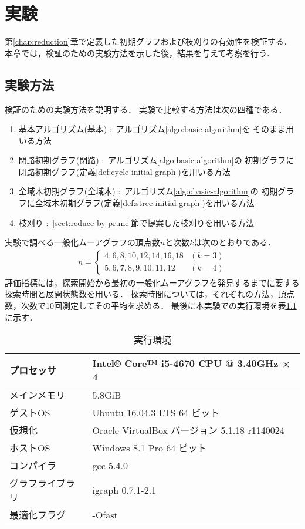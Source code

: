
\chapter{実験}
\label{sect:experiment}
第\ref{chap:reduction}章で定義した初期グラフおよび枝刈りの有効性を検証する．
本章では，検証のための実験方法を示した後，結果を与えて考察を行う．

\section{実験方法}
検証のための実験方法を説明する．
実験で比較する方法は次の四種である．
\begin{enumerate}
\item 基本アルゴリズム(基本) :\ アルゴリズム\ref{algo:basic-algorithm}を
  そのまま用いる方法
\item 閉路初期グラフ(閉路) :\ アルゴリズム\ref{algo:basic-algorithm}の
  初期グラフに閉路初期グラフ(定義\ref{def:cycle-initial-graph})を用いる方法
\item 全域木初期グラフ(全域木) :\ アルゴリズム\ref{algo:basic-algorithm}の
  初期グラフに全域木初期グラフ(定義\ref{def:stree-initial-graph})を用いる方法
\item 枝刈り :\ \ref{sect:reduce-by-prune}節で提案した枝刈りを用いる方法
\end{enumerate}
実験で調べる一般化ムーアグラフの頂点数$n$と次数$k$は次のとおりである．
\begin{equation*}
  \begin{aligned}
    n=\begin{cases}
      4,6,8,10,12,14,16,18 & (k=3) \\
      5,6,7,8,9,10,11,12 & (k=4)
    \end{cases}
  \end{aligned}
\end{equation*}
評価指標には，探索開始から最初の一般化ムーアグラフを発見するまでに要する
探索時間と展開状態数を用いる．
探索時間については，それぞれの方法，頂点数，次数で10回測定してその平均を求める．
最後に本実験での実行環境を表\ref{tab:env-lab}に示す．
\begin{table}
  \caption{実行環境}
  \label{tab:env-lab}
  \centering
  \begin{tabular}{ll}
    \hline
    プロセッサ & Intel® Core™ i5-4670 CPU @ 3.40GHz × 4 \\ \hline
    メインメモリ & 5.8GiB \\ \hline
    ゲストOS & Ubuntu 16.04.3 LTS 64 ビット \\ \hline
    仮想化 & Oracle VirtualBox バージョン 5.1.18 r1140024 \\ \hline
    ホストOS & Windows 8.1 Pro 64 ビット \\ \hline
    コンパイラ & gcc 5.4.0 \\ \hline
    グラフライブラリ & igraph 0.7.1-2.1 \\ \hline
    最適化フラグ & -Ofast \\ \hline
  \end{tabular}
\end{table}

